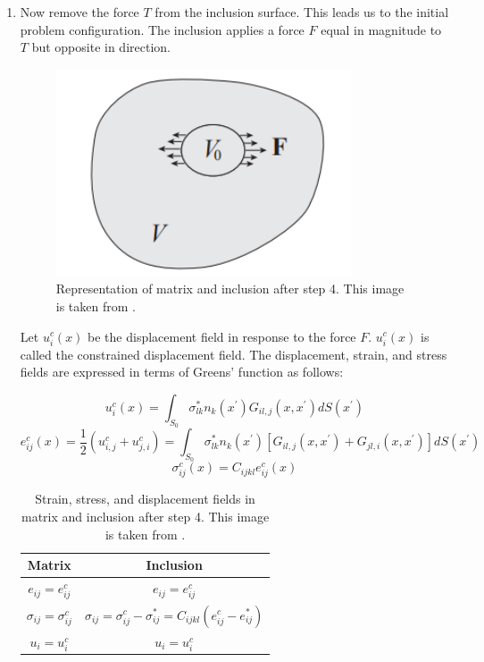 \documentclass[12pt, a4paper]{report}
\begin{document}
\begin{enumerate}
    \item Now remove the force $T$ from the inclusion surface. This leads us to the initial problem configuration. The inclusion applies a force $F$ equal in magnitude to $T$ but opposite in direction.
        \begin{figure}[H]
            \centering
            \includegraphics [height=2 in]{eigstress5}
            \caption{Representation of matrix and inclusion after step 4. This image is taken from \cite{stanford_notes}.}
            \label{fig:eigstress5}
        \end{figure}

        Let $u^{c}_{i}(x)$ be the displacement field in response to the force $F$. $u^{c}_{i}(x)$ is called the constrained displacement field. The displacement, strain, and stress fields are expressed in terms of Greens' function as follows:

        \begin{equation}
            u^{c}_{i}(x) = \int_{S_{0}} \sigma_{lk}^{*} n_{k}(x^{'}) G_{il,j}(x,x^{'})dS(x^{'})
        \end{equation}
        \begin{equation}
            e^{c}_{ij}(x) = \frac{1}{2} (u^{c}_{i,j} + u^{c}_{j,i}) = \int_{S_{0}} \sigma_{lk}^{*} n_{k}(x^{'}) [G_{il,j}(x,x^{'}) + G_{jl,i}(x,x^{'})]dS(x^{'})
        \end{equation}
        \begin{equation}
            \sigma^{c}_{ij}(x) = C_{ijkl}e^{c}_{ij}(x)
        \end{equation}

        \begin{table}[H]
            \centering
            \begin{tabular}{|c|c|}
                \hline
                \textbf{Matrix} & \textbf{Inclusion} \\
                \hline
                $e_{ij} = e^{c}_{ij}$ & $e_{ij} = e^{c}_{ij}$ \\
                $\sigma_{ij} = \sigma^{c}_{ij}$ & $\sigma_{ij} = \sigma^{c}_{ij} - \sigma^{*}_{ij} = C_{ijkl}(e^{c}_{ij} - e^{*}_{ij}) $ \\
                $u_{i} = u_{i}^{c}$ & $u_{i} = u_{i}^{c}$ \\
                \hline
            \end{tabular}
            \caption{Strain, stress, and displacement fields in matrix and inclusion after step 4. This image is taken from \cite{stanford_notes}.}
            \label{tab:step4}
        \end{table}


\end{enumerate}
\end{document}
